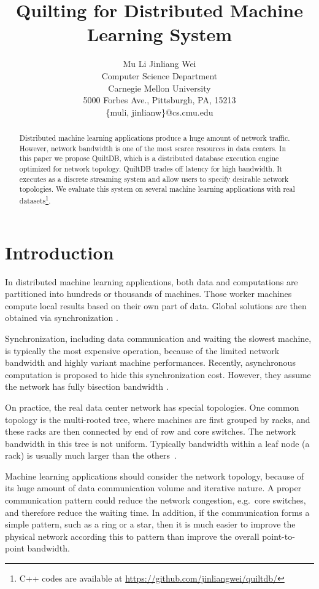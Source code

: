 \documentclass[11pt, twocolumn]{article}
\title{Quilting for Distributed Machine Learning System}
\author{Mu Li \quad Jinliang Wei\\ Computer Science Department
  \\Carnegie Mellon University\\
  5000 Forbes Ave., Pittsburgh, PA, 15213\\
\{muli, jinlianw\}@cs.cmu.edu}
\begin{document}
\maketitle

\begin{abstract}
  Distributed machine learning applications produce a huge amount of network
  traffic. However, network bandwidth is one of the most scarce resources in
  data centers.  In this paper we propose QuiltDB, which is a distributed
  database execution engine optimized for network topology. QuiltDB trades off
  latency for high bandwidth. It executes as a discrete streaming system and
  allow users to specify desirable network topologies. We evaluate this system
  on several machine learning applications with real datasets\footnote{C++ codes
    are available at \url{https://github.com/jinliangwei/quiltdb/}}.
\end{abstract}

\section{Introduction}

In distributed machine learning applications, both data and computations are
partitioned into hundreds or  thousands of machines. Those
worker machines compute local results based on their own part of data. Global solutions
are then obtained via synchronization \cite{AhmSheNarJosSmo13,
  HoCipCuiLeeetal13,Lietal13,DeaCorMonCheetal12,GonLowGuBicetal12,CheSonBaiLinetal11}.

Synchronization, including data communication and waiting the slowest machine, is typically
the most expensive operation, because of the limited network bandwidth and highly
variant machine performances. Recently, asynchronous computation is proposed
to hide this synchronization cost. However, they assume the network has fully
bisection bandwidth \cite{AsuSmyWel08,SmoNar10,AhmSheNarJosSmo13,Lietal13}.

On practice, the real data center network has special topologies. One common
topology is the multi-rooted tree, where  machines are first grouped by racks,
and these racks are then connected by
end of row and core switches. The network bandwidth in this tree is not
uniform. Typically bandwidth within a leaf node (a rack) is usually much larger
than the others~\cite{AlFLouVah08, BarHol09}.

Machine learning applications should consider the network topology, because of
its huge amount of data communication volume and iterative nature. A proper
communication pattern could reduce the network congestion, e.g.~core switches,
and therefore reduce the waiting time. In addition,
if the communication forms a simple pattern, such as a ring or a star, then it
is much easier to improve the physical network according this to pattern than
improve the overall point-to-point bandwidth.
\end{document}
